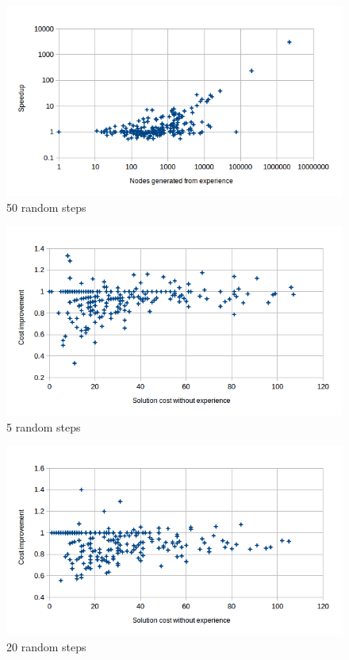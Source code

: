 \documentclass[letterpaper]{article}
\begin{document}
\begin{figure}
	\begin{center}
	\includegraphics[scale=0.5]{Speedup_100_50.png}
	\end{center}
	\caption{50 random steps}
	 \label{fig:s_100_50}
\end{figure}

\begin{figure}
	\begin{center}
	\includegraphics[scale=0.5]{Cost_100_5.png}
	\end{center}
	\caption{5 random steps}
	 \label{fig:c_100_5}
\end{figure}

\begin{figure}
	\begin{center}
	\includegraphics[scale=0.5]{Cost_100_20.png}
	\end{center}
	\caption{20 random steps}
	 \label{fig:c_100_20}
\end{figure}
\end{document}
